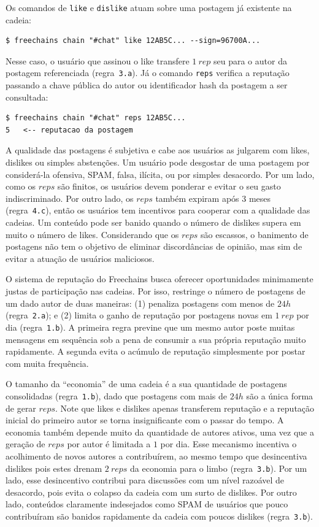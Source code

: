 \documentclass[12pt]{article}
\newcommand{\FC} {Freechains\xspace}
\begin{document}
Os comandos de \texttt{like} e \texttt{dislike} atuam sobre uma postagem já
existente na cadeia:
%
{\footnotesize
\begin{verbatim}
$ freechains chain "#chat" like 12AB5C... --sign=96700A...
\end{verbatim}
}
%
Nesse caso, o usuário que assinou o like transfere $1~rep$ seu para o autor da
postagem referenciada (regra~\texttt{3.a}).
%
Já o comando \texttt{reps} verifica a reputação passando a chave pública do
autor ou identificador hash da postagem a ser consultada:
%
{\footnotesize
\begin{verbatim}
$ freechains chain "#chat" reps 12AB5C...
5   <-- reputacao da postagem
\end{verbatim}
}

A qualidade das postagens é subjetiva e cabe aos usuários as julgarem com
likes, dislikes ou simples abstenções.
Um usuário pode desgostar de uma postagem por considerá-la ofensiva, SPAM,
falsa, ilícita, ou por simples desacordo.
Por um lado, como os $reps$ são finitos, os usuários devem ponderar e evitar o
seu gasto indiscriminado.
Por outro lado, os $reps$ também expiram após 3 meses (regra~\texttt{4.c}),
então os usuários tem incentivos para cooperar com a qualidade das cadeias.
Um conteúdo pode ser banido quando o número de dislikes supera em muito o
número de likes.
Considerando que os $reps$ são escassos, o banimento de postagens não tem o
objetivo de eliminar discordâncias de opinião, mas sim de evitar a atuação de
usuários maliciosos.

O sistema de reputação do \FC busca oferecer oportunidades minimamente justas
de participação nas cadeias.
Por isso, restringe o número de postagens de um dado autor de duas maneiras:
    (1) penaliza postagens com menos de $24h$ (regra~\texttt{2.a}); e
    (2) limita o ganho de reputação por postagens novas em $1~rep$ por dia
        (regra~\texttt{1.b}).
A primeira regra previne que um mesmo autor poste muitas mensagens em sequência
sob a pena de consumir a sua própria reputação muito rapidamente.
A segunda evita o acúmulo de reputação simplesmente por postar com muita
frequência.

O tamanho da ``economia'' de uma cadeia é a sua quantidade de postagens
consolidadas (regra~\texttt{1.b}), dado que postagens com mais de $24h$ são a
única forma de gerar $reps$.
Note que likes e dislikes apenas transferem reputação e a reputação inicial do
primeiro autor se torna insignificante com o passar do tempo.
A economia também depende muito da quantidade de autores ativos, uma vez que
a geração de $reps$ por autor é limitada a $1$ por dia.
Esse mecanismo incentiva o acolhimento de novos autores a contribuírem, ao
mesmo tempo que desincentiva dislikes pois estes drenam $2~reps$ da economia
para o limbo (regra~\texttt{3.b}).
Por um lado, esse desincentivo contribui para discussões com um nível razoável
de desacordo, pois evita o colapso da cadeia com um surto de dislikes.
Por outro lado, conteúdos claramente indesejados como SPAM de usuários que
pouco contribuíram são banidos rapidamente da cadeia com poucos dislikes
(regra~\texttt{3.b}).
\end{document}
